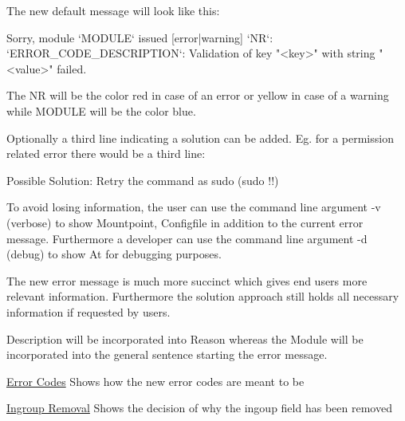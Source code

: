 

The new default message will look like this\+:


\begin{DoxyCode}
Sorry, module `MODULE` issued [error|warning] `NR`:
`ERROR\_CODE\_DESCRIPTION`: Validation of key "<key>" with string "<value>" failed.
\end{DoxyCode}


The {\ttfamily NR} will be the color red in case of an error or yellow in case of a warning while {\ttfamily M\+O\+D\+U\+LE} will be the color blue.

Optionally a third line indicating a solution can be added. Eg. for a permission related error there would be a third line\+:


\begin{DoxyCode}
Possible Solution: Retry the command as sudo (sudo !!)
\end{DoxyCode}


To avoid losing information, the user can use the command line argument {\ttfamily -\/v} (verbose) to show {\ttfamily Mountpoint}, {\ttfamily Configfile} in addition to the current error message. Furthermore a developer can use the command line argument {\ttfamily -\/d} (debug) to show {\ttfamily At} for debugging purposes.

The new error message is much more succinct which gives end users more relevant information. Furthermore the solution approach still holds all necessary information if requested by users.

{\ttfamily Description} will be incorporated into {\ttfamily Reason} whereas the {\ttfamily Module} will be incorporated into the general sentence starting the error message.


\begin{DoxyItemize}
\item \hyperlink{doc_decisions_error_codes_md}{Error Codes} Shows how the new error codes are meant to be
\item \hyperlink{doc_decisions_ingroup_removal_md}{Ingroup Removal} Shows the decision of why the {\ttfamily ingoup} field has been removed
\end{DoxyItemize}